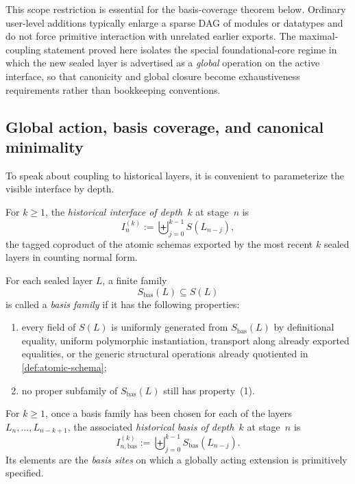 \documentclass{lmcs}
\begin{document}
This scope restriction is essential for the basis-coverage theorem below. Ordinary user-level additions typically enlarge a sparse DAG of modules or datatypes and do not force primitive interaction with unrelated earlier exports. The maximal-coupling statement proved here isolates the special foundational-core regime in which the new sealed layer is advertised as a \emph{global} operation on the active interface, so that canonicity and global closure become exhaustiveness requirements rather than bookkeeping conventions.

\subsection{Global action, basis coverage, and canonical minimality}

To speak about coupling to historical layers, it is convenient to parameterize the visible interface by depth.

\begin{defi}
\label{def:historical-interface}
For $k \geq 1$, the \emph{historical interface of depth~$k$} at stage~$n$ is
\[
  I_n^{(k)} := \biguplus_{j=0}^{k-1} S(L_{n-j}),
\]
the tagged coproduct of the atomic schemas exported by the most recent $k$ sealed layers in counting normal form.
\end{defi}

\begin{defi}
\label{def:basis-sites}
For each sealed layer $L$, a finite family
\[
  S_{\mathrm{bas}}(L) \subseteq S(L)
\]
is called a \emph{basis family} if it has the following properties:
\begin{enumerate}
  \item every field of $S(L)$ is uniformly generated from $S_{\mathrm{bas}}(L)$ by definitional equality, uniform polymorphic instantiation, transport along already exported equalities, or the generic structural operations already quotiented in \autoref{def:atomic-schema};
  \item no proper subfamily of $S_{\mathrm{bas}}(L)$ still has property~(1).
\end{enumerate}
For $k \geq 1$, once a basis family has been chosen for each of the layers
$L_n,\dots,L_{n-k+1}$, the associated \emph{historical basis of depth~$k$} at
stage~$n$ is
\[
  I_{n,\mathrm{bas}}^{(k)} := \biguplus_{j=0}^{k-1} S_{\mathrm{bas}}(L_{n-j}).
\]
Its elements are the \emph{basis sites} on which a globally acting extension is
primitively specified.
\end{defi}
\end{document}
